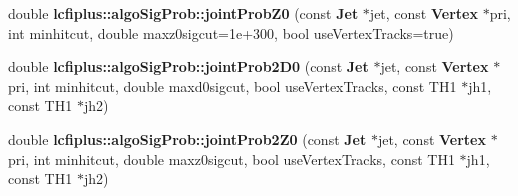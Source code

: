 \begin{DoxyCompactItemize}
\item 
double \textbf{ lcfiplus\+::algo\+Sig\+Prob\+::joint\+Prob\+Z0} (const \textbf{ Jet} $\ast$jet, const \textbf{ Vertex} $\ast$pri, int minhitcut, double maxz0sigcut=1e+300, bool use\+Vertex\+Tracks=true)
\item 
double \textbf{ lcfiplus\+::algo\+Sig\+Prob\+::joint\+Prob2\+D0} (const \textbf{ Jet} $\ast$jet, const \textbf{ Vertex} $\ast$pri, int minhitcut, double maxd0sigcut, bool use\+Vertex\+Tracks, const T\+H1 $\ast$jh1, const T\+H1 $\ast$jh2)
\item 
double \textbf{ lcfiplus\+::algo\+Sig\+Prob\+::joint\+Prob2\+Z0} (const \textbf{ Jet} $\ast$jet, const \textbf{ Vertex} $\ast$pri, int minhitcut, double maxz0sigcut, bool use\+Vertex\+Tracks, const T\+H1 $\ast$jh1, const T\+H1 $\ast$jh2)
\end{DoxyCompactItemize}

